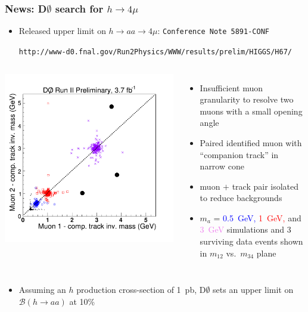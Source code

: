 \documentclass[compress]{beamer}
\begin{document}
\begin{frame}
\frametitle{News: D$\emptyset$ search for $h \to 4\mu$}

\begin{itemize}
\item Released upper limit on $h \to aa \to 4\mu$: {\scriptsize \tt Conference Note 5891-CONF}

{\scriptsize \tt http://www-d0.fnal.gov/Run2Physics/WWW/results/prelim/HIGGS/H67/}
\end{itemize}
\begin{columns}
\mbox{\hspace{0.5 cm}\includegraphics[width=\linewidth]{d0_search.pdf}}

\begin{itemize}
\item Insufficient muon granularity to resolve two muons with a small opening angle
\item Paired identified muon with \\ ``companion track'' in narrow cone
\item muon $+$ track pair isolated to reduce backgrounds
\item $m_a$ = \textcolor{blue}{0.5~GeV,} \textcolor{red}{1~GeV,} and \textcolor{violet}{3~GeV} simulations and 3 surviving data events shown in $m_{12}$ vs.\ $m_{34}$ plane
\end{itemize}
\end{columns}
\begin{itemize}
\item Assuming an $h$ production cross-section of 1~pb, D$\emptyset$ sets an upper limit on $\mathcal{B}(h \to aa)$ at 10\%
\end{itemize}
\end{frame}
\end{document}
